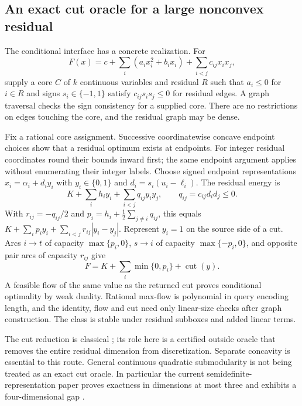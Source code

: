 \subsection{An exact cut oracle for a large nonconvex residual}
The conditional interface has a concrete realization. For
\[
F(x)=c+\sum_i(a_ix_i^2+b_ix_i)+\sum_{i<j}c_{ij}x_ix_j,
\]
supply a core $C$ of $k$ continuous variables and residual $R$ such that
$a_i\le0$ for $i\in R$ and signs $s_i\in\{-1,1\}$ satisfy
$c_{ij}s_is_j\le0$ for residual edges. A graph traversal checks the
sign consistency for a supplied core. There are no restrictions on edges
touching the core, and the residual graph may be dense.

Fix a rational core assignment. Successive coordinatewise concave
endpoint choices show that a residual optimum exists at endpoints.
For integer residual coordinates round their bounds inward first; the
same endpoint argument applies without enumerating their integer labels.
Choose signed endpoint representations $x_i=\alpha_i+d_iy_i$ with
$y_i\in\{0,1\}$ and $d_i=s_i(u_i-\ell_i)$. The residual energy is
\[
K+\sum_i h_iy_i+\sum_{i<j}q_{ij}y_iy_j,
\qquad q_{ij}=c_{ij}d_id_j\le0.
\]
With $r_{ij}=-q_{ij}/2$ and $p_i=h_i+\frac12\sum_{j\ne i}q_{ij}$,
this equals $K+\sum_ip_iy_i+\sum_{i<j}r_{ij}|y_i-y_j|$.
Represent $y_i=1$ on the source side of a cut. Arcs $i\to t$ of
capacity $\max\{p_i,0\}$, $s\to i$ of capacity
$\max\{-p_i,0\}$, and opposite pair arcs of capacity $r_{ij}$ give
\begin{equation}\label{eq:cutidentity}
F=K+\sum_i\min\{0,p_i\}+\operatorname{cut}(y).
\end{equation}
A feasible flow of the same value as the returned cut proves conditional
optimality by weak duality. Rational max-flow is polynomial in query
encoding length, and the identity, flow and cut need only linear-size
checks after graph construction. The class is stable under residual
subboxes and added linear terms.

The cut reduction is classical \cite{KolmogorovZabih2004}; its role here
is a certified outside oracle that removes the entire residual dimension
from discretization. Separate concavity is essential to this route.
General continuous quadratic submodularity is not being treated as an
exact cut oracle. In particular the current semidefinite-representation
paper proves exactness in dimensions at most three and exhibits a
four-dimensional gap \cite{BurerNatarajanWillemsen2026v3}.

